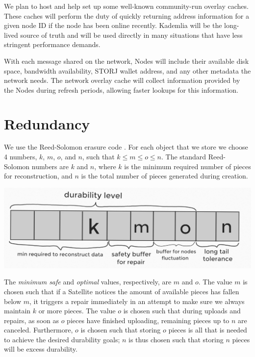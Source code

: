 \documentclass[8pt,fleqn,openany]{book}
\begin{document}
We plan to host and help set up some well-known community-run overlay caches.
These caches will perform the duty of quickly returning address information
for a given node ID if the node has been online recently. Kademlia will be the
long-lived source of truth and will be used directly in many situations that
have less stringent performance demands.

With each message shared on the network, Nodes will include their available
disk space, bandwidth availability, STORJ wallet address, and any other
metadata the network needs.
The network overlay cache will collect information provided by the Nodes
during refresh periods, allowing faster lookups for this information.

\section{Redundancy}\label{sec:concrete-redundancy}

We use the Reed-Solomon erasure code \cite{rs}. For each object that we store
we choose 4 numbers, $k$, $m$, $o$, and $n$, such that $k\le m\le o\le n$.
The standard Reed-Solomon numbers are $k$ and $n$, where $k$ is the minimum
required number of pieces for reconstruction, and $n$ is the total number of
pieces generated during creation.

\begin{center}
\includegraphics[width=\textwidth]{diagram-drafts/redundancy_kmon.png}
\end{center}

The {\em minimum safe} and {\em optimal} values, respectively, are $m$ and $o$. The
value $m$ is chosen such that if a Satellite notices the amount of available pieces
has fallen below $m$, it triggers a repair
immediately in an attempt to make sure we always maintain
$k$ or more pieces. The value $o$ is chosen such that during uploads and repairs,
as soon as $o$ pieces have finished uploading, remaining pieces up to $n$ are
canceled.
Furthermore, $o$ is chosen such that storing $o$ pieces is all that is
needed to achieve the desired durability goals; $n$ is thus chosen such that
storing $n$ pieces will be excess durability.
\end{document}
